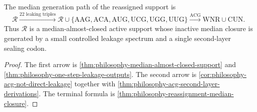 \begin{theorem}
\label{thm:philosophy-controlled-median-leakage}
The median generation path of the reassigned support is
$$
  \mathcal{R}
  \xrightarrow{22\text{ leaking triples}}
  \mathcal{R}\cup
  \{\mathrm{AAG},\mathrm{ACA},\mathrm{AUG},
    \mathrm{UCG},\mathrm{UGG},\mathrm{UUG}\}
  \xrightarrow{\mathrm{ACG}}
  \mathrm{WNR}\cup\mathrm{CUN}.
$$
Thus $\mathcal{R}$ is a median-almost-closed active support whose
inactive median closure is generated by a small controlled leakage
spectrum and a single second-layer sealing codon.
\end{theorem}
\begin{proof}
The first arrow is
\autoref{thm:philosophy-median-almost-closed-support} and
\autoref{thm:philosophy-one-step-leakage-outputs}. The second arrow is
\autoref{cor:philosophy-acg-not-direct-leakage} together with
\autoref{thm:philosophy-acg-second-layer-derivations}. The terminal
formula is \autoref{thm:philosophy-reassignment-median-closure}.
\end{proof}
